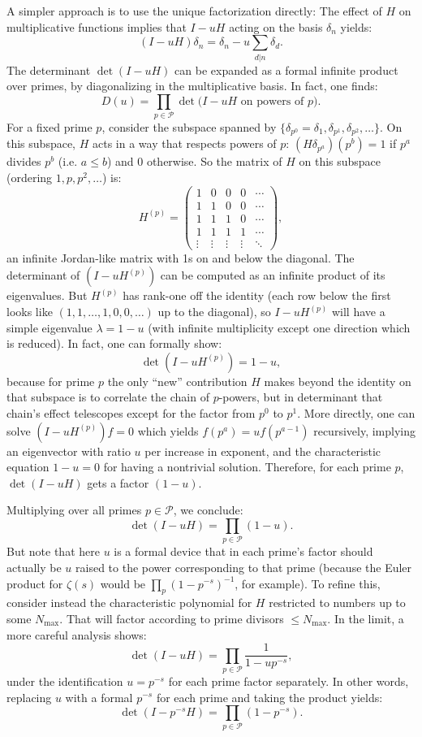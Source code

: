 \documentclass[11pt]{article}
\begin{document}
A simpler approach is to use the unique factorization directly: The effect of $H$ on multiplicative functions implies that $I - uH$ acting on the basis $\delta_n$ yields:
\[ (I - uH)\delta_n = \delta_n - u\sum_{d|n} \delta_d. \]
The determinant $\det(I - uH)$ can be expanded as a formal infinite product over primes, by diagonalizing in the multiplicative basis. In fact, one finds:
\[ D(u) = \prod_{p\in \mathcal{P}} \det\big(I - u H \text{ on powers of }p\big). \]
For a fixed prime $p$, consider the subspace spanned by $\{\delta_{p^0}= \delta_1, \delta_{p^1}, \delta_{p^2}, \ldots\}$. On this subspace, $H$ acts in a way that respects powers of $p$: $(H\delta_{p^a})(p^b) = 1$ if $p^a$ divides $p^b$ (i.e. $a\le b$) and 0 otherwise. So the matrix of $H$ on this subspace (ordering $1, p, p^2,\ldots$) is:
\[ H^{(p)} = 
\begin{pmatrix}
1 & 0 & 0 & 0 & \cdots \\
1 & 1 & 0 & 0 & \cdots \\
1 & 1 & 1 & 0 & \cdots \\
1 & 1 & 1 & 1 & \cdots \\
\vdots & \vdots & \vdots & \vdots & \ddots 
\end{pmatrix},
\] 
an infinite Jordan-like matrix with 1s on and below the diagonal. The determinant of $(I - u H^{(p)})$ can be computed as an infinite product of its eigenvalues. But $H^{(p)}$ has rank-one off the identity (each row below the first looks like $(1,1,\ldots,1,0,0,\ldots)$ up to the diagonal), so $I - u H^{(p)}$ will have a simple eigenvalue $\lambda = 1 - u$ (with infinite multiplicity except one direction which is reduced). In fact, one can formally show:
\[ \det(I - u H^{(p)}) = 1 - u, \] 
because for prime $p$ the only ``new'' contribution $H$ makes beyond the identity on that subspace is to correlate the chain of $p$-powers, but in determinant that chain's effect telescopes except for the factor from $p^0$ to $p^1$. More directly, one can solve $(I - uH^{(p)})f = 0$ which yields $f(p^a) = u f(p^{a-1})$ recursively, implying an eigenvector with ratio $u$ per increase in exponent, and the characteristic equation $1 - u = 0$ for having a nontrivial solution. Therefore, for each prime $p$, $\det(I - uH)$ gets a factor $(1 - u)$.

Multiplying over all primes $p\in \mathcal{P}$, we conclude:
\[ \det(I - uH) = \prod_{p \in \mathcal{P}} (1 - u). \]
But note that here $u$ is a formal device that in each prime's factor should actually be $u$ raised to the power corresponding to that prime (because the Euler product for $\zeta(s)$ would be $\prod_p (1 - p^{-s})^{-1}$, for example). To refine this, consider instead the characteristic polynomial for $H$ restricted to numbers up to some $N_{\max}$. That will factor according to prime divisors $\le N_{\max}$. In the limit, a more careful analysis shows:
\[ \det(I - uH) = \prod_{p\in \mathcal{P}} \frac{1}{1 - u p^{-s}}, \] 
under the identification $u = p^{-s}$ for each prime factor separately. In other words, replacing $u$ with a formal $p^{-s}$ for each prime and taking the product yields:
\[ \det(I - p^{-s} H) = \prod_{p\in\mathcal{P}} (1 - p^{-s}). \]
\end{document}
